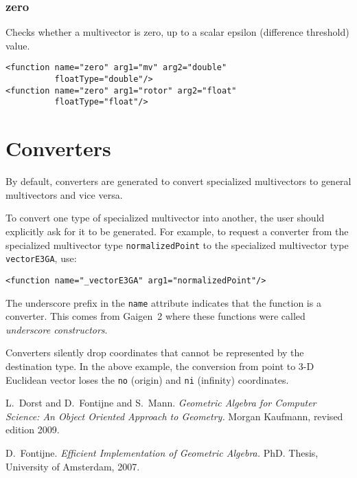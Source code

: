 \documentclass[10pt, a4paper]{article}
\begin{document}
\subsubsection*{zero}

Checks whether a multivector is zero, up to a scalar epsilon (difference threshold) value.
\begin{verbatim}
<function name="zero" arg1="mv" arg2="double" 
          floatType="double"/>
<function name="zero" arg1="rotor" arg2="float" 
          floatType="float"/>
\end{verbatim}


\section{Converters}
\label{s:converters}

By default, converters are generated to convert specialized multivectors
to general multivectors and vice versa.

To convert one type of specialized multivector into another, the user
should explicitly ask for it to be generated. For example, to request
a converter from the specialized multivector type {\tt normalizedPoint}
to the specialized multivector type {\tt vectorE3GA}, use:
\begin{verbatim}
<function name="_vectorE3GA" arg1="normalizedPoint"/>
\end{verbatim}
The underscore prefix in the {\tt name} attribute indicates that the function 
is a converter. This comes from Gaigen~2 where these functions were called
\emph{underscore constructors}.

Converters silently drop coordinates that cannot be represented by the
destination type. In the above example, the conversion from point to
3-D Euclidean vector loses the {\tt no} (origin) and {\tt ni} (infinity)
coordinates.



\iffalse
\section{Why did you write Gaigen 2.5 in C\#?}

I wrote Gaigen 2.5 in C\# because I wanted to try out the .Net platform
(it's pretty nice).
I assumed that Mono would be good enough to run Gaigen 2.5 on OS X and
Linux, but it is slightly disappointing in speed. Hopefully the Mono
team will improve Mono's performance in the future.
\fi



\begin{thebibliography}{}


	
 L.~Dorst and D.~Fontijne and S.~Mann.
	\emph{Geometric Algebra for Computer Science: An Object Oriented Approach to Geometry.}
	Morgan Kaufmann, revised edition 2009.

 D.~Fontijne.
	\emph{Efficient Implementation of Geometric Algebra.}
	PhD. Thesis, University of Amsterdam, 2007.


\end{thebibliography}
\end{document}
